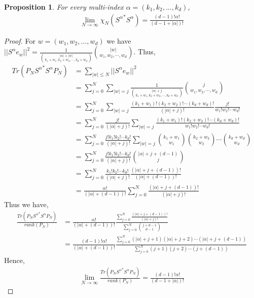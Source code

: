 \documentclass[article]{amsart}
\newtheorem{proposition}        [theorem]{Proposition}
\begin{document}
\begin{proposition}\label{eq18}
    For every multi-index $\alpha= (k_1, k_2,...,k_d)$,
    \begin{align*}
    \lim_{N\rightarrow \infty} \chi_N({S^{\alpha}}^* S^{\alpha})= \frac{(d-1)! \alpha!}{(d-1+|\alpha|)!}
    \end{align*}
\end{proposition}
\begin{proof}
For $w=(w_1,w_2,...,w_d)$ we have $||S^{\alpha  } e_w||^2= \frac{1}{\binom{|\alpha|+|w|}{k_1 + w_1, k_2+w_2,\cdots,k_d+w_d}} \binom{|w|}{w_1,w_2,\cdots,w_d}$. Thus,
\begin{align*}
Tr(P_N {S^{\alpha}}^* S^{\alpha} P_N) &= \sum_{|w|\leq N} ||S^{\alpha} e_w||^2\\
& = \sum_{j=0}^N \sum_{|w|=j} \frac{1}{\binom{|\alpha|+j}{k_1 + w_1, k_2+w_2,\cdots,k_d+w_d}}\binom{j}{w_1,w_2,\cdots,w_d} \\
& = \sum_{j=0}^N \sum_{|w|=j}\frac{(k_1+w_1)!(k_2+w_2)!\cdots(k_d+w_d)!}{(|\alpha|+j)!} \frac{j!}{w_1! w_2! \cdots w_d!}\\
& = \sum_{j=0}^N \frac{j!}{(|\alpha|+j)!} \sum_{|w|=j} \frac{(k_1+w_1)! (k_2+w_2)!\cdots (k_d+w_d)!}{w_1!w_2!\cdots w_d!}\\
& = \sum_{j=0}^N \frac{j!k_1! k_2!\cdots k_d!}{(|\alpha|+j)!} \sum_{|w|=j} \binom{k_1+w_1}{w_1} \binom{k_2+w_2}{w_2}\cdots \binom{k_d+w_d}{w_d}\\
& = \sum_{j=0}^N \frac{j!k_1! k_2!\cdots k_d!}{(|\alpha|+j)!} \binom{|\alpha|+j +(d-1)}{j}\\
& = \sum_{j=0}^N \frac{k_1!k_2!\cdots k_d!}{(|\alpha|+ j)!} \frac{(|\alpha|+j+(d-1))!}{(|\alpha|+(d-1))!}\\
& = \frac{\alpha!}{(|\alpha|+(d-1))!}\sum_{j=0}^N \frac{(|\alpha|+j+(d-1))!}{(|\alpha|+j)!}
\end{align*}
Thus we have,
\begin{align*}
\frac{Tr(P_N{S^{\alpha}}^* S^{\alpha} P_N)}{rank(P_N)}& = \frac{\alpha!}{(|\alpha|+(d-1))!}\frac{\sum_{j=0}^N \frac{(|\alpha|+j+(d-1))!}{(|\alpha|+j)!}}{\sum_{j=0}^N {j+d-1 \choose d-1}}\\
& = \frac{(d-1)!\alpha!}{(|\alpha|+(d-1))!} \frac{\sum_{j=0}^N(|\alpha|+ j+1) (|\alpha|+j+2)\cdots (|\alpha|+j+(d-1))}{\sum_{j=0}^N (j+1)(j+2)\cdots (j+(d-1))}
\end{align*}
Hence,
\begin{align*}
\lim_{N\rightarrow \infty} \frac{Tr(P_N{S^{\alpha}}^* S^{\alpha}P_N)}{rank(P_N)}= \frac{(d-1)! \alpha!}{(d-1+|\alpha|)!}
\end{align*}
\end{proof}
\end{document}
